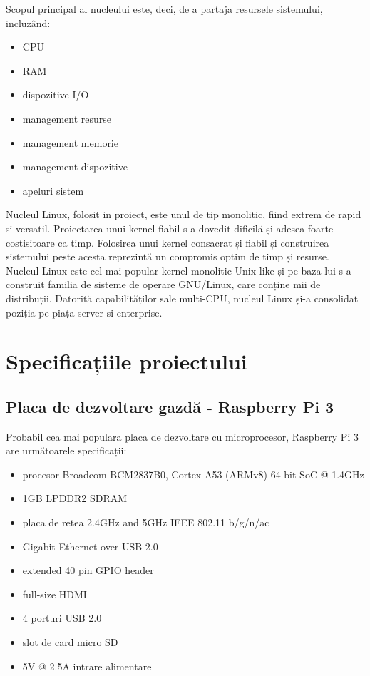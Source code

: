 \documentclass[a4paper, 12pt, twoside]{report}
\begin{document}
Scopul principal al nucleului este, deci, de a partaja resursele sistemului, incluzând:
\begin{itemize}
\item CPU
\item RAM
\item dispozitive I/O
\item management resurse
\item management memorie
\item management dispozitive
\item apeluri sistem
\end{itemize}

Nucleul Linux, folosit in proiect, este unul de tip monolitic, fiind extrem de rapid si versatil. Proiectarea unui kernel fiabil s-a dovedit dificilă și adesea foarte costisitoare ca timp. Folosirea unui kernel consacrat și fiabil și construirea sistemului peste acesta reprezintă un compromis optim de timp și resurse. Nucleul Linux este cel mai popular kernel monolitic Unix-like și pe baza lui s-a construit familia de sisteme de operare GNU/Linux, care conține mii de distribuții. Datorită capabilităților sale multi-CPU, nucleul Linux și-a consolidat poziția pe piața server si enterprise.


\chapter{Specificațiile proiectului}
	\section{Placa de dezvoltare gazdă - Raspberry Pi 3}
Probabil cea mai populara placa de dezvoltare cu microprocesor, Raspberry Pi 3 are următoarele specificații:
\begin{itemize}
\item procesor Broadcom BCM2837B0, Cortex-A53 (ARMv8) 64-bit SoC @ 1.4GHz
\item 1GB LPDDR2 SDRAM
\item placa de retea 2.4GHz and 5GHz IEEE 802.11 b/g/n/ac
\item Gigabit Ethernet over USB 2.0
\item extended 40 pin GPIO header
\item full-size HDMI
\item 4 porturi USB 2.0
\item slot de card micro SD
\item 5V @ 2.5A intrare alimentare
\end{itemize}
\end{document}
